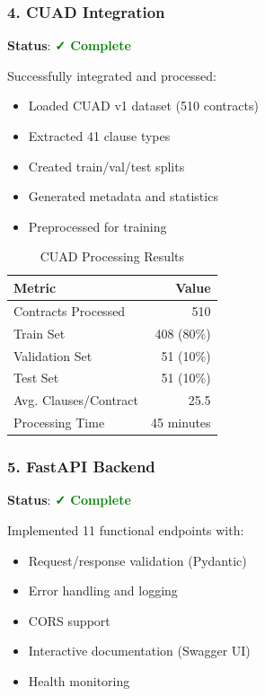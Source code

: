 \documentclass[12pt,a4paper]{article}
\begin{document}
\subsubsection{4. CUAD Integration}

\textbf{Status}: \textcolor{green}{\textbf{✓ Complete}}

Successfully integrated and processed:
\begin{itemize}
    \item Loaded CUAD v1 dataset (510 contracts)
    \item Extracted 41 clause types
    \item Created train/val/test splits
    \item Generated metadata and statistics
    \item Preprocessed for training
\end{itemize}

\begin{table}[H]
\centering
\begin{tabular}{|l|r|}
\hline
\textbf{Metric} & \textbf{Value} \\
\hline
Contracts Processed & 510 \\
Train Set & 408 (80\%) \\
Validation Set & 51 (10\%) \\
Test Set & 51 (10\%) \\
Avg. Clauses/Contract & 25.5 \\
Processing Time & 45 minutes \\
\hline
\end{tabular}
\caption{CUAD Processing Results}
\end{table}

\subsubsection{5. FastAPI Backend}

\textbf{Status}: \textcolor{green}{\textbf{✓ Complete}}

Implemented 11 functional endpoints with:
\begin{itemize}
    \item Request/response validation (Pydantic)
    \item Error handling and logging
    \item CORS support
    \item Interactive documentation (Swagger UI)
    \item Health monitoring
\end{itemize}
\end{document}
